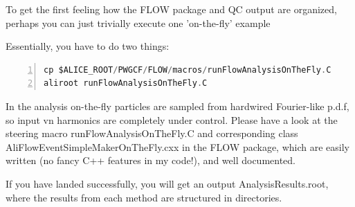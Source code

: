 \documentclass[a4paper]{book}
\numberwithin{equation}{subsection}
\begin{document}
 To get the first feeling how the FLOW package and QC output are organized, perhaps you can just trivially execute one 'on-the-fly' example 

 Essentially, you have to do two things: 
	\begin{lstlisting}[language=C, numbers=left]
cp $ALICE_ROOT/PWGCF/FLOW/macros/runFlowAnalysisOnTheFly.C
aliroot runFlowAnalysisOnTheFly.C \end{lstlisting}

 In the analysis on-the-fly particles are sampled from hardwired Fourier-like p.d.f, so input vn harmonics are completely under control. Please have a look at the steering macro runFlowAnalysisOnTheFly.C and corresponding class AliFlowEventSimpleMakerOnTheFly.cxx in the FLOW package, which are easily written (no fancy C++ features in my code!), and well documented. 

 If you have landed successfully, you will get an output AnalysisResults.root, where the results from each method are structured in directories. 
\end{document}
